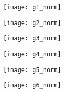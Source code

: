 \begin{figure}[h]
\begin{subfigure}[b]{0.16\textwidth}
	\centering
	\texttt{[image: g1\_norm]}
\end{subfigure}
\begin{subfigure}[b]{0.16\textwidth}
	\centering
	\texttt{[image: g2\_norm]}
\end{subfigure}
\begin{subfigure}[b]{0.16\textwidth}
	\centering
	\texttt{[image: g3\_norm]}
\end{subfigure}
\begin{subfigure}[b]{0.16\textwidth}
	\centering
	\texttt{[image: g4\_norm]}
\end{subfigure}
\begin{subfigure}[b]{0.16\textwidth}
	\centering
	\texttt{[image: g5\_norm]}
\end{subfigure}
\begin{subfigure}[b]{0.16\textwidth}
	\centering
	\texttt{[image: g6\_norm]}
\end{subfigure}\\


\end{figure}
